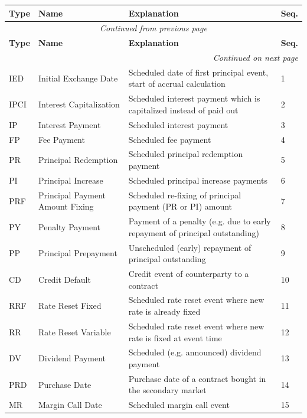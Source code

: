 \documentclass[9pt,oneside]{amsart}
\begin{document}
\begin{longtable}{| p{}p{}p{}p{} |}
	\hline
	\textbf{Type} & \textbf{Name} & \textbf{Explanation} & \textbf{Seq.} \\
	\hline
	\endfirsthead
	\multicolumn{4}{c}{\textit{Continued from previous page}} \\
	\hline
	\textbf{Type} & \textbf{Name} & \textbf{Explanation} & \textbf{Seq.} \\
	\hline
	\endhead
	\hline \multicolumn{4}{r}{\textit{Continued on next page}} \\
	\endfoot
	\endlastfoot	
	IED & Initial Exchange Date & Scheduled date of first principal event, start of accrual calculation & 1 \\
	\hline
	IPCI & Interest Capitalization & Scheduled interest payment which is capitalized instead of paid out & 2 \\
	\hline
	IP & Interest Payment & Scheduled interest payment & 3 \\
	\hline
	FP & Fee Payment & Scheduled fee payment & 4 \\
	\hline
	PR & Principal Redemption & Scheduled principal redemption payment & 5 \\
	\hline
	PI & Principal Increase & Scheduled principal increase payments & 6 \\	
	\hline
	PRF & Principal Payment Amount Fixing & Scheduled re-fixing of principal payment (PR or PI) amount & 7 \\
	\hline
	PY & Penalty Payment & Payment of a penalty (e.g. due to early repayment of principal outstanding) & 8 \\
	\hline
	PP & Principal Prepayment & Unscheduled (early) repayment of principal outstanding & 9 \\
	\hline
	CD & Credit Default & Credit event of counterparty to a contract & 10 \\
	\hline
	RRF & Rate Reset Fixed & Scheduled rate reset event where new rate is already fixed & 11 \\
	\hline
	RR & Rate Reset Variable & Scheduled rate reset event where new rate is fixed at event time & 12 \\
	\hline
	DV & Dividend Payment & Scheduled (e.g. announced) dividend payment & 13 \\
	\hline
	PRD & Purchase Date & Purchase date of a contract bought in the secondary market & 14 \\
	\hline
	MR & Margin Call Date & Scheduled margin call event & 15 \\

\end{longtable}
\end{document}

